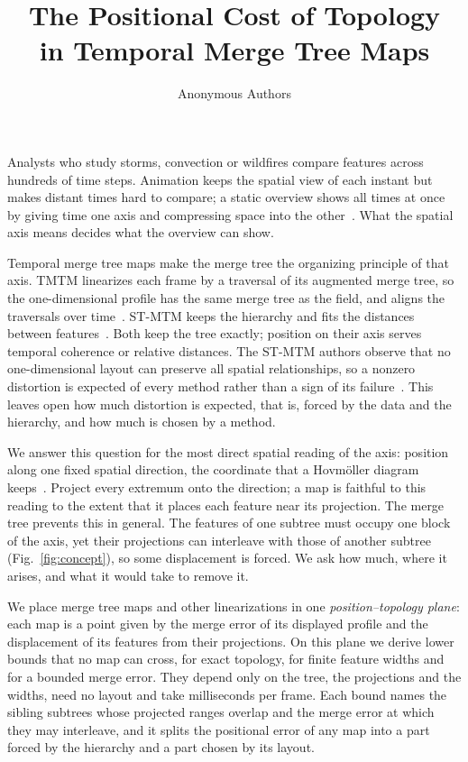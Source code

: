 \documentclass[review]{vgtc}
\title{The Positional Cost of Topology\\in Temporal Merge Tree Maps}
\author{Anonymous Authors}
\begin{document}
\maketitle
\raggedbottom
\setlength{\emergencystretch}{1.5em}
Analysts who study storms, convection or wildfires compare features across hundreds of time steps. Animation keeps the spatial view of each instant but makes distant times hard to compare; a static overview shows all times at once by giving time one axis and compressing space into the other~\cite{Tversky:2002:Animation,Robertson:2008:Animation,Bach:2017:STC}. What the spatial axis means decides what the overview can show.

Temporal merge tree maps make the merge tree the organizing principle of that axis. TMTM linearizes each frame by a traversal of its augmented merge tree, so the one-dimensional profile has the same merge tree as the field, and aligns the traversals over time~\cite{Koepp:2023:TMTM}. ST-MTM keeps the hierarchy and fits the distances between features~\cite{STMTM:2026}. Both keep the tree exactly; position on their axis serves temporal coherence or relative distances. The ST-MTM authors observe that no one-dimensional layout can preserve all spatial relationships, so a nonzero distortion is expected of every method rather than a sign of its failure~\cite{STMTM:2026}. This leaves open how much distortion is expected, that is, forced by the data and the hierarchy, and how much is chosen by a method.

We answer this question for the most direct spatial reading of the axis: position along one fixed spatial direction, the coordinate that a Hovm\"oller diagram keeps~\cite{Hovmoller:1949}. Project every extremum onto the direction; a map is faithful to this reading to the extent that it places each feature near its projection. The merge tree prevents this in general. The features of one subtree must occupy one block of the axis, yet their projections can interleave with those of another subtree (Fig.~\ref{fig:concept}), so some displacement is forced. We ask how much, where it arises, and what it would take to remove it.

We place merge tree maps and other linearizations in one \emph{position--topology plane}: each map is a point given by the merge error of its displayed profile and the displacement of its features from their projections. On this plane we derive lower bounds that no map can cross, for exact topology, for finite feature widths and for a bounded merge error. They depend only on the tree, the projections and the widths, need no layout and take milliseconds per frame. Each bound names the sibling subtrees whose projected ranges overlap and the merge error at which they may interleave, and it splits the positional error of any map into a part forced by the hierarchy and a part chosen by its layout.
\end{document}
